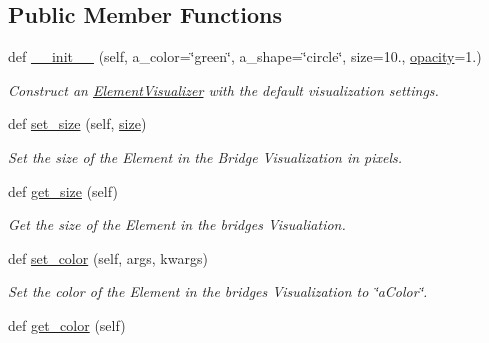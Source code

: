\subsection*{Public Member Functions}
\begin{DoxyCompactItemize}
\item 
def \mbox{\hyperlink{classbridges_1_1element__visualizer_1_1_element_visualizer_ac1d0a9aad14cb2fe50aa0d8025256e3b}{\+\_\+\+\_\+init\+\_\+\+\_\+}} (self, a\+\_\+color=\char`\"{}green\char`\"{}, a\+\_\+shape=\char`\"{}circle\char`\"{}, size=10., \mbox{\hyperlink{classbridges_1_1element__visualizer_1_1_element_visualizer_add8eebf4bece910f0d6899fedd71b139}{opacity}}=1.)
\begin{DoxyCompactList}\small\item\em Construct an \mbox{\hyperlink{classbridges_1_1element__visualizer_1_1_element_visualizer}{Element\+Visualizer}} with the default visualization settings. \end{DoxyCompactList}\item 
def \mbox{\hyperlink{classbridges_1_1element__visualizer_1_1_element_visualizer_a4c258c07eebe5d3e81fd0dbfb017e171}{set\+\_\+size}} (self, \mbox{\hyperlink{classbridges_1_1element__visualizer_1_1_element_visualizer_ad8effb64ea33382a723c2c4948048d17}{size}})
\begin{DoxyCompactList}\small\item\em Set the size of the Element in the Bridge Visualization in pixels. \end{DoxyCompactList}\item 
def \mbox{\hyperlink{classbridges_1_1element__visualizer_1_1_element_visualizer_addebee12d11b59b5711ecf3dc79cbadc}{get\+\_\+size}} (self)
\begin{DoxyCompactList}\small\item\em Get the size of the Element in the bridges Visualiation. \end{DoxyCompactList}\item 
def \mbox{\hyperlink{classbridges_1_1element__visualizer_1_1_element_visualizer_a3f44be7172d4c812729ddbbcc188c543}{set\+\_\+color}} (self, args, kwargs)
\begin{DoxyCompactList}\small\item\em Set the color of the Element in the bridges Visualization to \char`\"{}a\+Color\char`\"{}. \end{DoxyCompactList}\item 
def \mbox{\hyperlink{classbridges_1_1element__visualizer_1_1_element_visualizer_a0055a5c8e76655dbcb7234a86ea5c634}{get\+\_\+color}} (self)

\end{DoxyCompactItemize}
